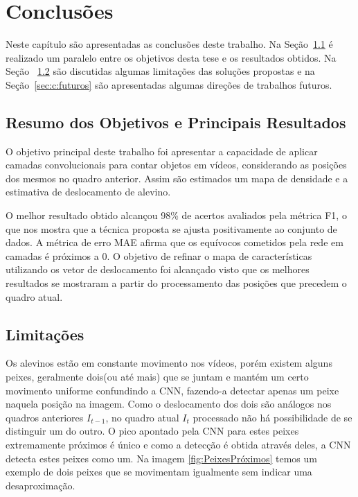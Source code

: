 \chapter{Conclusões}
\label{chap:conclusoes}

Neste capítulo são apresentadas as conclusões deste trabalho. Na
Seção~\ref{sec:c:resumo} é realizado um paralelo entre os objetivos desta tese
e os resultados obtidos. Na Seção~ \ref{sec:c:limitacoes} são discutidas
algumas limitações das soluções propostas e na Seção~\ref{sec:c:futuros} são
apresentadas algumas direções de trabalhos futuros.

\section{Resumo dos Objetivos e Principais Resultados}
\label{sec:c:resumo}

O objetivo principal deste trabalho foi apresentar a capacidade de aplicar camadas convolucionais para contar objetos em vídeos, considerando as posições dos mesmos no quadro anterior. Assim são estimados um mapa de densidade e a estimativa de deslocamento de alevino.

O melhor resultado obtido alcançou 98\% de acertos avaliados pela métrica F1, o que nos mostra que a técnica proposta se ajusta positivamente ao conjunto de dados. A métrica de erro MAE afirma que os equívocos cometidos pela rede em camadas é próximos a 0.
O objetivo de refinar o mapa de características utilizando os vetor de deslocamento foi alcançado visto que os melhores resultados se mostraram a partir do processamento das posições que precedem o quadro atual.

\section{Limitações}
\label{sec:c:limitacoes}

Os alevinos estão em constante movimento nos vídeos, porém existem alguns peixes, geralmente dois(ou até mais) que se juntam e mantém um certo movimento uniforme confundindo a CNN, fazendo-a detectar apenas um peixe naquela posição na imagem. Como o deslocamento dos dois são análogos nos quadros anteriores $I_{t-1}$, no quadro atual $I_{t}$ processado não há possibilidade de se distinguir um do outro. O pico apontado pela CNN para estes peixes extremamente próximos é único e como a detecção é obtida através deles, a CNN detecta estes peixes como um. Na imagem \ref{fig:PeixesPróximos} temos um exemplo de dois peixes que se movimentam igualmente sem indicar uma desaproximação.

